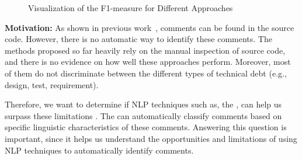 \begin{figure}[!thb]
  \centering
  \vspace{-3mm}
  \caption{Visualization of the F1-measure for Different Approaches}
\end{figure}

\vspace{3mm}
\noindent\rqi
\vspace{3mm}

\noindent \textbf{Motivation:} As shown in previous work~\cite{Maldonado2015MTD}, \SATD comments can be found in the source code. However, there is no automatic way to identify these comments. The methods proposed so far heavily rely on the manual inspection of source code, and there is no evidence on how well these approaches perform. Moreover, most of them do not discriminate between the different types of technical debt (e.g., design, test, requirement).

Therefore, we want to determine if NLP techniques such as, the , can help us surpass these limitations . The  can automatically classify comments based on specific linguistic characteristics of these comments. Answering this question is important, since it helps us understand the opportunities and limitations of using NLP techniques to automatically identify \SATD comments. 

